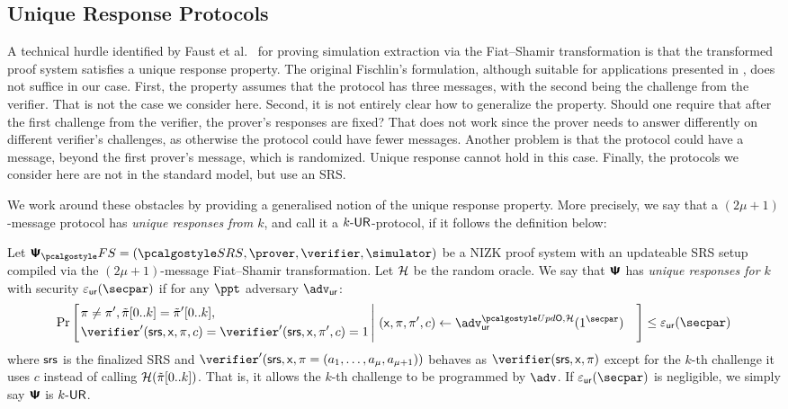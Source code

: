 \subsection{Unique Response Protocols}
A technical hurdle identified by Faust et al.~\cite{INDOCRYPT:FKMV12} for proving
simulation extraction via the Fiat--Shamir transformation is that the transformed
proof system satisfies a unique response property. The original Fischlin's
formulation, although suitable for applications presented in
\cite{C:Fischlin05,INDOCRYPT:FKMV12}, does not suffice in our case. First, the
property assumes that the protocol has three messages, with the second being the
challenge from the verifier. That is not the case we consider here. Second, it is not
entirely clear how to generalize the property. Should one require that after the
first challenge from the verifier, the prover's responses are fixed?  That does not
work since the prover needs to answer differently on different verifier's challenges,
as otherwise the protocol could have fewer messages.  Another problem is that the
protocol could have a message, beyond the first prover's message, which is
randomized. Unique response cannot hold in this case. Finally, the protocols we
consider here are not in the standard model, but use an SRS.

We work around these obstacles by providing a generalised notion of the unique
response property. More precisely, we say that a $(2\mu + 1)$-message protocol
has \emph{unique responses from $k$}, and call it a ${k\text{-}\mathsf{UR}}$-protocol, if it
follows the definition below:

\begin{definition}
Let $\psfs = (\SRScer, \prover, \verifier, \simulator)$ be a NIZK proof system with an updateable SRS setup compiled via the $(2\mu + 1)$-message Fiat--Shamir transformation. Let $\mathcal{H}$ be the random oracle. 
We say that $\bm{\mathsf{\Psi}}$ has \emph{unique responses for $k$} with security $\epsur(\secpar)$ if for any $\ppt$ adversary $\advur$:
  \[
	\Pr\left[
		\left.
	\begin{aligned}
	& \zkproof \neq \zkproof', \tzkproof[0..k] = \tzkproof'[0..k],  \\
	& \verifier' (\srs, \inp, \zkproof,c) =
	\verifier' (\srs, \inp, \zkproof',c) = 1  \\
	\end{aligned}
	\,\right|\,
	\begin{aligned}
		& (\inp, \zkproof, \zkproof', c) \gets \advur^{\initU,\ro}(1^\secpar) 
	\end{aligned}
	\right] \leq \epsur(\secpar) 
	\]
	where $\mathsf{srs}$ is the finalized SRS and $\verifier'(\srs,\inp,\zkproof=(a_1, \dots, a_\mu,a_{\mu+1}))$ behaves as $\verifier (\srs, \inp, \zkproof)$ except for the $k$-th challenge it uses $c$ instead of calling $\mathcal{H}(\tilde{\pi}[0..k]) $. That is, it allows the $k$-th challenge to be programmed by $\adv$. 
	If $\epsur(\secpar)$ is negligible, we simply say $\bm{\mathsf{\Psi}}$ is ${k\text{-}\mathsf{UR}}$.
\end{definition}

